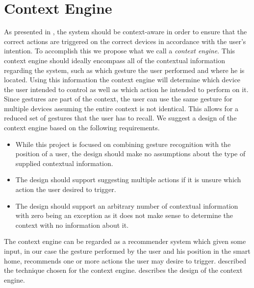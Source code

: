 \section{Context Engine}
\label{sec:analysis:context-engine}

As presented in , the system should be context-aware in order to ensure that the correct actions are triggered on the correct devices in accordance with the user's intention.
To accomplish this we propose what we call a \emph{context engine}.
This context engine should ideally encompass all of the contextual information regarding the system, such as which gesture the user performed and where he is located.
Using this information the context engine will determine which device the user intended to control as well as which action he intended to perform on it.
Since gestures are part of the context, the user can use the same gesture for multiple devices assuming the entire context is not identical.
This allows for a reduced set of gestures that the user has to recall.
We suggest a design of the context engine based on the following requirements.

\begin{itemize}
\item While this project is focused on combining gesture recognition with the position of a user, the design should make no assumptions about the type of supplied contextual information.
\item The design should support suggesting multiple actions if it is unsure which action the user desired to trigger.
\item The design should support an arbitrary number of contextual information with zero being an exception as it does not make sense to determine the context with no information about it.
\end{itemize}

The context engine can be regarded as a recommender system which given some input, in our case the gesture performed by the user and his position in the smart home, recommends one or more actions the user may desire to trigger.  described the technique chosen for the context engine.  describes the design of the context engine.

